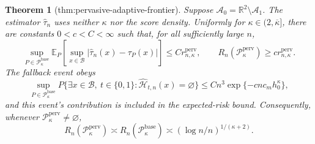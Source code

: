 \documentclass{article}
\newtheorem{theorem}{Theorem}
\begin{document}
\begin{theorem}[thm:pervasive-adaptive-frontier]\label{thm:pervasive-adaptive-frontier}
Suppose \(\mathcal A_0=\mathbb R^2\setminus\mathcal A_1\). The estimator \(\widehat\tau_n\) uses neither \(\kappa\) nor the score density. Uniformly for \(\kappa\in(2,\overline\kappa]\), there are constants \(0<c<C<\infty\) such that, for all sufficiently large \(n\),
\[
 \sup_{P\in\mathcal P_{\kappa}^{\mathrm{base}}}
 \mathbb E_P\!\left[\sup_{x\in\mathcal B}|\widehat\tau_n(x)-\tau_P(x)|\right]
 \le C r_{n,\kappa}^{\mathrm{perv}},
 \qquad
 R_n(\mathcal P_{\kappa}^{\mathrm{perv}})\ge c r_{n,\kappa}^{\mathrm{perv}}.
\]
The fallback event obeys
\[
 \sup_{P\in\mathcal P_{\kappa}^{\mathrm{base}}}
 P\{\exists x\in\mathcal B,\ t\in\{0,1\}:\widehat{\mathcal H}_{t,n}(x)=\varnothing\}
 \le Cn^3\exp\{-c n c_m h_0^{\kappa}\},
\]
and this event's contribution is included in the expected-risk bound.  Consequently, whenever \(\mathcal P_{\kappa}^{\mathrm{perv}}\ne\varnothing\),
\[
 R_n(\mathcal P_{\kappa}^{\mathrm{perv}})
 \asymp R_n(\mathcal P_{\kappa}^{\mathrm{base}})
 \asymp (\log n/n)^{1/(\kappa+2)}.
\]
\end{theorem}
\end{document}
